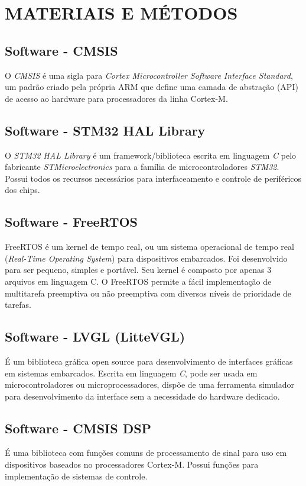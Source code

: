 \documentclass[times, twoside, watermark]{artigo}
\begin{document}
\section*{MATERIAIS E MÉTODOS}
\setcounter{section}{-1}

\subsection{Software - CMSIS}
O \textit{CMSIS} é uma sigla para \textit{Cortex Microcontroller Software Interface Standard}, um padrão criado pela própria ARM que define uma camada de abstração (API) de acesso ao hardware para processadores da linha Cortex-M.


\subsection{Software - STM32 HAL Library}
O \textit{STM32 HAL Library} é um framework/biblioteca escrita em linguagem \textit{C} pelo fabricante \textit{STMicroelectronics} para a família de microcontroladores \textit{STM32}.
Possui todos os recursos necessários para interfaceamento e controle de periféricos dos chips.

\subsection{Software - FreeRTOS}
FreeRTOS é um kernel de tempo real, ou um sistema operacional de tempo real (\textit{Real-Time Operating System}) para dispositivos embarcados. Foi desenvolvido para ser pequeno, simples e portável. Seu kernel é composto por apenas 3 arquivos em linguagem C. O FreeRTOS permite a fácil implementação de multitarefa preemptiva ou não preemptiva com diversos níveis de prioridade de tarefas.

\subsection{Software - LVGL (LitteVGL)}
É um biblioteca gráfica open source para desenvolvimento de interfaces gráficas em sistemas embarcados. Escrita em linguagem \textit{C}, pode ser usada em microcontroladores ou microprocessadores, dispõe de uma ferramenta simulador para desenvolvimento da interface sem a necessidade do hardware dedicado.

\subsection{Software - CMSIS DSP}
É uma biblioteca com funções comuns de processamento de sinal para uso em dispositivos baseados no processadores Cortex-M. Possui funções para implementação de sistemas de controle.
\end{document}
